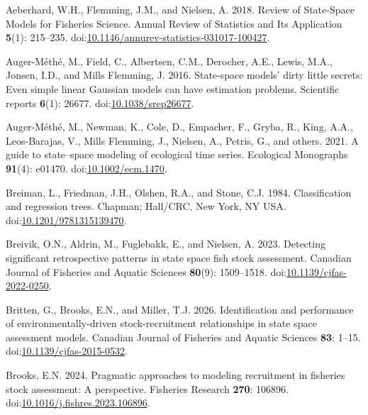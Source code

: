 \documentclass[
  12pt,
]{article}
\newlength{\cslhangindent}
\newenvironment{CSLReferences}[2] %
 {\begin{list}{}{%
  \setlength{\itemindent}{0pt}
  \setlength{\leftmargin}{0pt}
  \setlength{\parsep}{0pt}
  \ifodd #1
   \setlength{\leftmargin}{\cslhangindent}
   \setlength{\itemindent}{-1\cslhangindent}
  \fi
  \setlength{\itemsep}{#2\baselineskip}}}
 {\end{list}}
\begin{document}
\protect{}\label{refs}
\begin{CSLReferences}{1}{0}
Aeberhard, W.H., Flemming, J.M., and Nielsen, A. 2018. Review of
{State}-{Space Models} for {Fisheries Science}. Annual Review of
Statistics and Its Application \textbf{5}(1): 215--235.
doi:\href{https://doi.org/10.1146/annurev-statistics-031017-100427}{10.1146/annurev-statistics-031017-100427}.

Auger-Méthé, M., Field, C., Albertsen, C.M., Derocher, A.E., Lewis,
M.A., Jonsen, I.D., and Mills Flemming, J. 2016. State-space models'
dirty little secrets: Even simple linear {G}aussian models can have
estimation problems. Scientific reports \textbf{6}(1): 26677.
doi:\href{https://doi.org/10.1038/srep26677}{10.1038/srep26677}.

{Auger-Méthé, M., Newman, K., Cole, D., Empacher, F., Gryba, R., King,
A.A., Leos-Barajas, V., Mills Flemming, J., Nielsen, A., Petris, G., and
others}. 2021. A guide to state--space modeling of ecological time
series. Ecological Monographs \textbf{91}(4): e01470.
doi:\href{https://doi.org/10.1002/ecm.1470}{10.1002/ecm.1470}.

Breiman, L., Friedman, J.H., Olshen, R.A., and Stone, C.J. 1984.
Classification and regression trees. Chapman; Hall/CRC, New York, NY
USA.
doi:\href{https://doi.org/10.1201/9781315139470}{10.1201/9781315139470}.

Breivik, O.N., Aldrin, M., Fuglebakk, E., and Nielsen, A. 2023.
Detecting significant retrospective patterns in state space fish stock
assessment. Canadian Journal of Fisheries and Aquatic Sciences
\textbf{80}(9): 1509--1518.
doi:\href{https://doi.org/10.1139/cjfas-2022-0250}{10.1139/cjfas-2022-0250}.

Britten, G., Brooks, E.N., and Miller, T.J. 2026. Identification and
performance of environmentally-driven stock-recruitment relationships in
state space assessment models. Canadian Journal of Fisheries and Aquatic
Sciences \textbf{83}: 1--15.
doi:\href{https://doi.org/10.1139/cjfas-2015-0532}{10.1139/cjfas-2015-0532}.

Brooks, E.N. 2024. Pragmatic approaches to modeling recruitment in
fisheries stock assessment: A perspective. Fisheries Research
\textbf{270}: 106896.
doi:\href{https://doi.org/10.1016/j.fishres.2023.106896}{10.1016/j.fishres.2023.106896}.


\end{CSLReferences}
\end{document}
